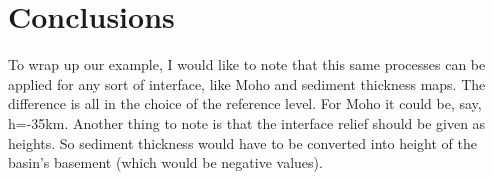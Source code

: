 \documentclass[a4paper]{article}
\begin{document}
\section{Conclusions}

To wrap up our example, I would like to note that this same processes can be applied
for any sort of interface, like Moho and sediment thickness maps. The difference is
all in the choice of the reference level. For Moho it could be, say, h=-35km.
Another thing to note is that the interface relief should be given as heights.
So sediment thickness would have to be converted into height of the basin's  basement
(which would be negative values).
\end{document}
